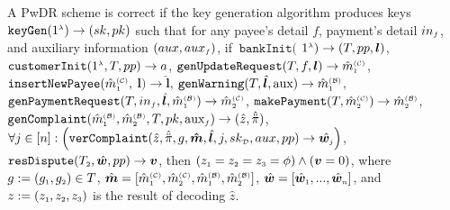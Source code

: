 \begin{definition}[Correctness] A PwDR scheme is correct if the key generation algorithm produces keys $\mathtt{keyGen}(1^{\scriptscriptstyle \lambda})\rightarrow (sk,pk)$ such that for any payee's detail $f$, payment's detail $in_{\scriptscriptstyle f}$, and auxiliary information $(aux, aux_{\scriptscriptstyle f})$, if $\ \mathtt{bankInit}($ $1^{\scriptscriptstyle \lambda})\rightarrow (T, pp, \bm{l})$, $\mathtt{customerInit} (1^{\scriptscriptstyle \lambda}, T, pp)\rightarrow a$, $\mathtt{genUpdateRequest}(T, f, {\bm l})\rightarrow \hat m^{\scriptscriptstyle\mathcal{(C)}}_{\scriptscriptstyle 1}$, $\mathtt{insertNewPayee}(\hat{m}^{\scriptscriptstyle\mathcal{(C)}}_{\scriptscriptstyle 1}, $ ${\bm l})\rightarrow  \hat{\bm l}$, $\mathtt{genWarning}(T, \hat{\bm l}, \text{aux})\rightarrow \hat m^{\scriptscriptstyle\mathcal{(B)}}_{\scriptscriptstyle1}$, $\mathtt{genPaymentRequest}(T, in_{\scriptscriptstyle f}, \hat{\bm{l}}, \hat m^{\scriptscriptstyle\mathcal{(B)}}_{\scriptscriptstyle1})\rightarrow \hat m^{\scriptscriptstyle\mathcal{(C)}}_{\scriptscriptstyle2}$, $\mathtt{makePayment}(T, \hat m^{\scriptscriptstyle\mathcal{(C)}}_{\scriptscriptstyle2})\rightarrow \hat m^{\scriptscriptstyle\mathcal{(B)}}_{\scriptscriptstyle2}$, $\mathtt{genComplaint}(\hat m^{\scriptscriptstyle\mathcal{(B)}}_{\scriptscriptstyle 1}, \hat m^{\scriptscriptstyle\mathcal{(B)}}_{\scriptscriptstyle2}, T, pk, \text{aux}_{\scriptscriptstyle f})\rightarrow (\hat z, \hat{\ddot \pi})$, 
$\forall j\in [n]: \Big(\mathtt{verComplaint}( \hat z, \hat{\ddot{\pi}}, g, \bm{\hat{m}}, \hat{\bm{l}}, j, sk_{\scriptscriptstyle\mathcal D}, aux, pp)\rightarrow \hat{\bm{w}_{\scriptscriptstyle j}}\Big)$, 
 $\mathtt{resDispute}(T_{\scriptscriptstyle 2}, \hat {\bm w}, pp)\rightarrow {\bm v}$, then $(z_{\scriptscriptstyle 1}=z_{\scriptscriptstyle 2}=z_{\scriptscriptstyle 3}=\phi) \wedge({\bm{v}}=0)$, where $g:=(g_{\scriptscriptstyle 1}, g_{\scriptscriptstyle 2})\in T$,   $\hat {\bm m}=[\hat {m}^{\scriptscriptstyle (\mathcal{C})}_{\scriptscriptstyle 1}, \hat {m}^{\scriptscriptstyle (\mathcal{C})}_{\scriptscriptstyle 2}, \hat {m}^{\scriptscriptstyle (\mathcal{B})}_{\scriptscriptstyle 1}, \hat {m}^{\scriptscriptstyle (\mathcal{B})}_{\scriptscriptstyle 2}]$,   $\hat {\bm w}=[{\hat{\bm w}}_{\scriptscriptstyle 1},...,{\hat{\bm w}}_{\scriptscriptstyle n}]$,  and $z:=(z_{\scriptscriptstyle 1}, z_{\scriptscriptstyle 2}, z_{\scriptscriptstyle 3})$ is the result of  decoding  $\hat{z}$.
\end{definition}





